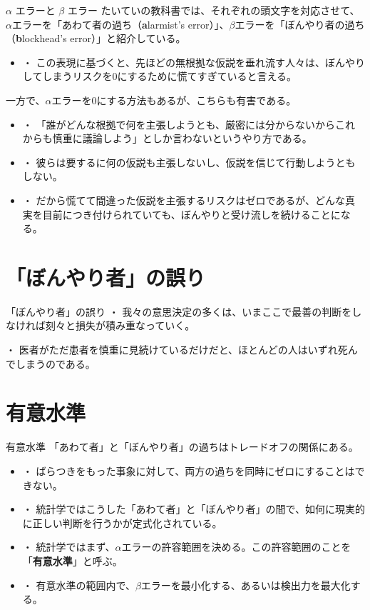\documentclass[dvipdfmx, autodetect-engine, aspectratio=169, 10.5pt]{beamer}
\begin{document}
\begin{frame}{$\alpha$ エラーと $\beta$ エラー}
	たいていの教科書では、それぞれの頭文字を対応させて、$\alpha$エラーを「あわて者の過ち（\textbf{a}larmist's error）」、$\beta$エラーを「ぼんやり者の過ち（\textbf{b}lockhead's error）」と紹介している。
	\begin{itemize}
		\item ・ この表現に基づくと、先ほどの無根拠な仮説を垂れ流す人々は、ぼんやりしてしまうリスクを0にするために慌てすぎていると言える。
	\end{itemize}
	一方で、$\alpha$エラーを0にする方法もあるが、こちらも有害である。
	\begin{itemize}
		\item ・ 「誰がどんな根拠で何を主張しようとも、厳密には分からないからこれからも慎重に議論しよう」としか言わないというやり方である。
		\item ・ 彼らは要するに何の仮説も主張しないし、仮説を信じて行動しようともしない。
		\item ・ だから慌てて間違った仮説を主張するリスクはゼロであるが、どんな真実を目前につき付けられていても、ぼんやりと受け流しを続けることになる。
	\end{itemize}
\end{frame}

\section{「ぼんやり者」の誤り}

\begin{frame}{「ぼんやり者」の誤り}
	・ 我々の意思決定の多くは、いまここで最善の判断をしなければ刻々と損失が積み重なっていく。
    
		      \vspace{7mm}
              
	・ 医者がただ患者を慎重に見続けているだけだと、ほとんどの人はいずれ死んでしまうのである。
\end{frame}

\section{有意水準}

\begin{frame}{有意水準}
	「あわて者」と「ぼんやり者」の過ちはトレードオフの関係にある。
	\begin{itemize}
		\item ・ ばらつきをもった事象に対して、両方の過ちを同時にゼロにすることはできない。
        \vspace{5mm}
        \item ・ 統計学ではこうした「あわて者」と「ぼんやり者」の間で、如何に現実的に正しい判断を行うかが定式化されている。
        \vspace{5mm}
        \item ・ 統計学ではまず、$\alpha$エラーの許容範囲を決める。この許容範囲のことを「\textbf{有意水準}」と呼ぶ。
        \item ・ 有意水準の範囲内で、$\beta$エラーを最小化する、あるいは検出力を最大化する。
	\end{itemize}
\end{frame}
\end{document}

